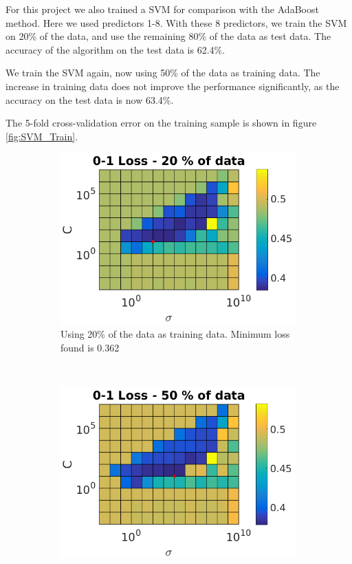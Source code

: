 \noindent For this project we also trained a SVM for comparison with the AdaBoost method. Here we used  predictors 1-8.
With these 8 predictors, we train the SVM on 20\% of the data, and use the remaining 80\% of the data as test data. The accuracy of the algorithm on the test data is 62.4\%.

\noindent We train the SVM again, now using 50\% of the data as training data. The increase in training data does not improve the performance significantly, as the accuracy on the test data is now 63.4\%.

\noindent The 5-fold cross-validation error on the training sample is shown in figure \ref{fig:SVM_Train}.

\begin{figure}[h]
    \centering
    \begin{subfigure}[b]{0.45\textwidth}
        \includegraphics[width=\textwidth]{Pix/SVM_02.png}
		\caption{Using 20\% of the data as training data. Minimum loss found is 0.362}
		\label{fig:SVM_02}
    \end{subfigure}
    ~
    \begin{subfigure}[b]{0.45\textwidth}
        \includegraphics[width=\textwidth]{Pix/SVM_05.png}

\end{subfigure}
\end{figure}
